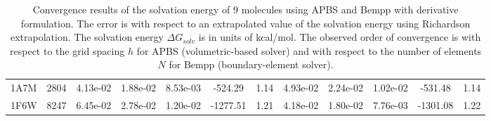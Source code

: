 \documentclass[12pt]{article}
\begin{document}
\begin{landscape}
\begin{table}[]
{\begin{tabular}{cc|ccc|cc|ccc|cc}
    1A7M & 2804 & 4.13e-02 & 1.88e-02 & 8.53e-03 & -524.29                            & 1.14                   & 4.93e-02 & 2.24e-02 & 1.02e-02 & -531.48                            & 1.14                   \\
    1F6W & 8247 & 6.45e-02 & 2.78e-02 & 1.20e-02 & -1277.51                           & 1.21                   & 4.18e-02 & 1.80e-02 & 7.76e-03 & -1301.08                           & 1.22                     
    \end{tabular}
    }
    \caption{Convergence results of the solvation energy of 9 molecules using APBS and Bempp with derivative formulation.
    The error is with respect to an extrapolated value of the solvation energy using Richardson extrapolation.
    The solvation energy $\Delta G_{solv}$ is in units of kcal/mol.
    The observed order of convergence is with respect to the grid spacing $h$ for APBS (volumetric-based solver) and with respect to the number of elements $N$ for Bempp (boundary-element solver).}
    \label{tab:APBS_result}
\end{table}
\end{landscape}

{}

\end{document}
